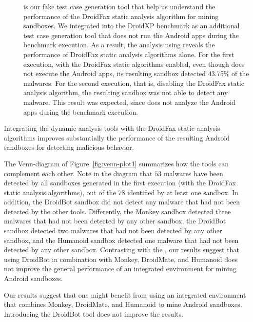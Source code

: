 \begin{description}
  \item[\joke] is our fake test case generation tool that help us understand the performance of the DroidFax static analysis algorithm for mining sandboxes.
    We integrated \joke into the DroidXP benchmark as an additional test case generation tool that does not run the Android apps during the benchmark execution.
    As a result, the analysis using \joke reveals the performance of DroidFax static analysis algorithms alone. For the first execution, with the DroidFax static
    algorithms enabled, even though \joke does not execute the Android apps, its resulting sandbox detected 43.75\% of the malwares. For the second execution,
    that is, disabling the DroidFax static analysis algorithm, the resulting \joke sandbox was not able to detect any malware. This result
    was expected, since \joke does not analyze the Android apps during the benchmark execution.

\end{description}


\begin{finding}
  Integrating the dynamic analysis tools
  with the DroidFax static analysis algorithms
  improves substantially the performance
  of the resulting Android sandboxes for
  detecting malicious behavior. 
\end{finding}
 
The Venn-diagram of Figure~\ref{fig:venn-plot1}
summarizes how the tools can complement each other.
Note in the diagram that $53$ malwares have been detected
by all sandboxes generated in the first execution (with the DroidFax static analysis algorithms),
out of the 78 identified by at least one sandbox. In addition, the DroidBot sandbox did not detect
any malware that had not been detected by the other tools. Differently, the Monkey sandbox detected
three malwares that had not been detected by any other sandbox, the DroidBot sandbox detected two malwares
that had not been detected by any other sandbox, and the Humanoid sandbox detected one malware that had not
been detected by any other sandbox. Contrasting with the \blls,
our results suggest that using DroidBot in combination with Monkey, DroidMate, and Humanoid
does not improve the general performance of an integrated environment for mining
Android sandboxes.

\begin{finding}
  Our results suggest that one might benefit from using  an integrated
  environment that combines Monkey, DroidMate, and Humanoid to
  mine Android sandboxes. Introducing the DroidBot 
  tool does not improve the results.
\end{finding}


